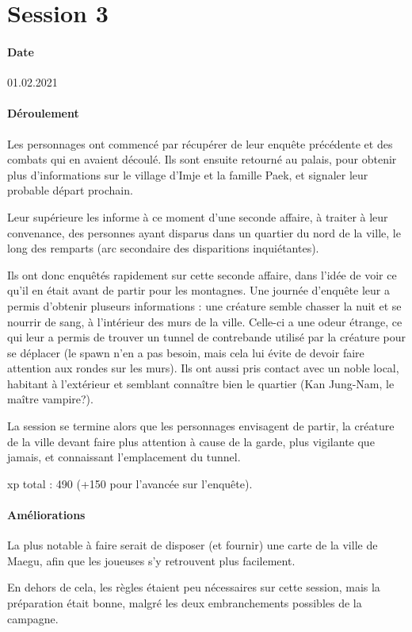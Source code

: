\documentclass[10pt,a4paper]{book}
\begin{document}
\section{Session 3}
\paragraph{Date}01.02.2021
\paragraph{Déroulement}
Les personnages ont commencé par récupérer de leur enquête précédente et des combats qui en avaient découlé. Ils sont ensuite retourné au palais, pour obtenir plus d'informations sur le village d'Imje et la famille Paek, et signaler leur probable départ prochain.

Leur supérieure les informe à ce moment d'une seconde affaire, à traiter à leur convenance, des personnes ayant disparus dans un quartier du nord de la ville, le long des remparts (arc secondaire des disparitions inquiétantes).

Ils ont donc enquêtés rapidement sur cette seconde affaire, dans l'idée de voir ce qu'il en était avant de partir pour les montagnes. Une journée d'enquête leur a permis d'obtenir pluseurs informations : une créature semble chasser la nuit et se nourrir de sang, à l'intérieur des murs de la ville. Celle-ci a une odeur étrange, ce qui leur a permis de trouver un tunnel de contrebande utilisé par la créature pour se déplacer (le spawn n'en a pas besoin, mais cela lui évite de devoir faire attention aux rondes sur les murs). Ils ont aussi pris contact avec un noble local, habitant à l'extérieur et semblant connaître bien le quartier (Kan Jung-Nam, le maître vampire?).

La session se termine alors que les personnages envisagent de partir, la créature de la ville devant faire plus attention à cause de la garde, plus vigilante que jamais, et connaissant l'emplacement du tunnel.

xp total : 490 (+150 pour l'avancée sur l'enquête).
\paragraph{Améliorations}
La plus notable à faire serait de disposer (et fournir) une carte de la ville de Maegu, afin que les joueuses s'y retrouvent plus facilement.

En dehors de cela, les règles étaient peu nécessaires sur cette session, mais la préparation était bonne, malgré les deux embranchements possibles de la campagne.
\end{document}
